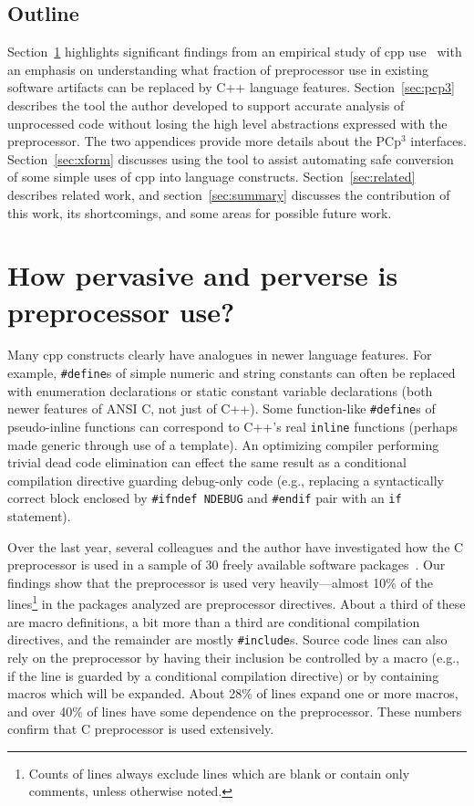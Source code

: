 \documentclass{article}
\newcommand{\pcp}{\mbox{\textsf{PCp}$^3$}}
\newcommand{\Cpp}{\mbox{\textsf{cpp}}}
\newcommand{\CPP}{\mbox{\textsf{C++}}}
\newcommand{\C}{\mbox{\textsf{C}}}
\newcommand{\ppd}[1]{\texttt{\##1}}
\newcommand{\eg}{e.g.,}
\begin{document}
\subsection{Outline}

Section~\ref{sec:feasibility} highlights significant findings from an
empirical study of \Cpp{} use~\cite{EmpCpp} with an emphasis on
understanding what fraction of preprocessor use in existing software
artifacts can be replaced by \CPP{} language features.
Section~\ref{sec:pcp3} describes the tool the author developed to
support accurate analysis of unprocessed code without losing the high
level abstractions expressed with the preprocessor.  The two appendices
provide more details about the \pcp{} interfaces.
Section~\ref{sec:xform} discusses using the tool to assist automating
safe conversion of some simple uses of \Cpp{} into language constructs.
Section~\ref{sec:related} describes related work, and
section~\ref{sec:summary} discusses the contribution of this work, its
shortcomings, and some areas for possible future work.


\section{How pervasive and perverse is preprocessor use?}
\label{sec:feasibility}
Many \Cpp{} constructs clearly have analogues in newer language
features.  For example, \ppd{define}s of simple numeric and string
constants can often be replaced with enumeration declarations or static
constant variable declarations (both newer features of ANSI \C{}, not
just of \CPP{}).  Some function-like \ppd{define}s of pseudo-inline
functions can correspond to \CPP{}'s real \texttt{inline} functions
(perhaps made generic through use of a template).  An optimizing
compiler performing trivial dead code elimination can effect the same
result as a conditional compilation directive guarding debug-only code
(e.g., replacing a syntactically correct block enclosed by
\texttt{\ppd{ifndef} NDEBUG} and \ppd{endif} pair with an \texttt{if}
statement).

Over the last year, several colleagues and the author have investigated
how the \C{} preprocessor is used in a sample of 30 freely available
software packages~\cite{EmpCpp}.  Our findings show that the
preprocessor is used very heavily---almost 10\% of the
lines\footnote{Counts of lines always exclude lines which are blank or
  contain only comments, unless otherwise noted.} in the packages
analyzed are preprocessor directives.  About a third of these are macro
definitions, a bit more than a third are conditional compilation
directives, and the remainder are mostly \ppd{include}s.  Source code
lines can also rely on the preprocessor by having their inclusion be
controlled by a macro (\eg{} if the line is guarded by a conditional
compilation directive) or by containing macros which will be expanded.
About 28\% of lines expand one or more macros, and over 40\% of lines have some
dependence on the preprocessor.  These numbers confirm that \C{}
preprocessor is used extensively.
\end{document}
